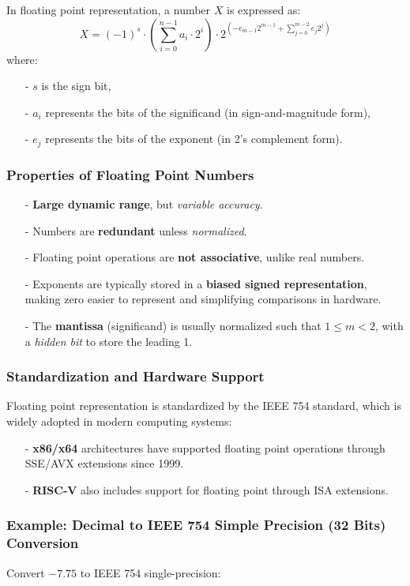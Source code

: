 In floating point representation, a number \( X \) is expressed as:
\[
X = (-1)^s \cdot \left(\sum_{i=0}^{n-1} a_i \cdot 2^i \right) \cdot 2^{\left( - e_{m-1} 2^{m-1} + \sum_{j=0}^{m-2} e_j 2^j \right)}
\]
where:
\begin{itemize}
    \item[-] \( s \) is the sign bit,
    \item[-] \( a_i \) represents the bits of the significand (in sign-and-magnitude form),
    \item[-] \( e_j \) represents the bits of the exponent (in 2's complement form).
\end{itemize}

\subsubsection{Properties of Floating Point Numbers}
\begin{itemize}
    \item[-] \textbf{Large dynamic range}, but \textit{variable accuracy}.
    \item[-] Numbers are \textbf{redundant} unless \textit{normalized}.
    \item[-] Floating point operations are \textbf{not associative}, unlike real numbers.
    \item[-] Exponents are typically stored in a \textbf{biased signed representation}, making zero easier to represent and simplifying comparisons in hardware.
    \item[-] The \textbf{mantissa} (significand) is usually normalized such that \(1 \leq m < 2\), with a \textit{hidden bit} to store the leading 1.
\end{itemize}

\subsubsection{Standardization and Hardware Support}
Floating point representation is standardized by the IEEE 754 standard, which is widely adopted in modern computing systems:
\begin{itemize}
    \item[-] \textbf{x86/x64} architectures have supported floating point operations through SSE/AVX extensions since 1999.
    \item[-] \textbf{RISC-V} also includes support for floating point through ISA extensions.
\end{itemize}

\subsubsection{Example: Decimal to IEEE 754 Simple Precision (32 Bits) Conversion}
Convert \( -7.75 \) to IEEE 754 single-precision:

